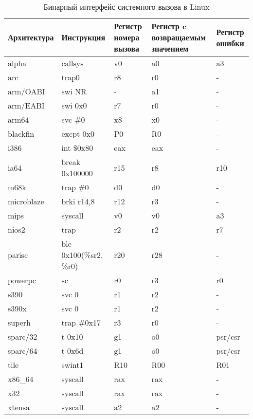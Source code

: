 \begin{table}[t!]
  \caption{Бинарный интерфейс системного вызова в Linux}
  \label{table:syscall_abi}
  \begin{tabular}{| >{\raggedright}m{}
                  | >{}m{}
                  | >{}m{}
                  | >{}m{}
                  | >{\arraybackslash}m{}|}
    \hline
    Архитектура & Инструкция & Регистр номера вызова & Регистр c возвращаемым значением & Регистр ошибки \\ \hline
    alpha & callsys & v0 & a0 & a3 \\ \hline
    arc & trap0 & r8 & r0 & - \\ \hline
    arm/OABI & swi NR & - & a1 & - \\ \hline
    arm/EABI & swi 0x0 & r7 & r0 & - \\ \hline
    arm64 & svc \#0 & x8 & x0 & - \\ \hline
    blackfin & excpt 0x0 & P0 & R0 & - \\ \hline
    i386 & int \$0x80 & eax & eax & - \\ \hline
    ia64 & break 0x100000 & r15 & r8 & r10 \\ \hline
    m68k & trap \#0 & d0 & d0 &  - \\ \hline
    microblaze & brki r14,8 & r12 & r3 & - \\ \hline
    mips & syscall & v0 & v0 & a3 \\ \hline
    nios2 & trap & r2 & r2 & r7 \\ \hline
    parisc & ble 0x100(\%sr2, \%r0) & r20 & r28 & - \\ \hline
    powerpc & sc & r0 & r3 & r0 \\ \hline
    s390 & svc 0 & r1 & r2 & - \\ \hline
    s390x & svc 0 & r1 & r2 & - \\ \hline
    superh & trap \#0x17 & r3 & r0 & - \\ \hline
    sparc/32 & t 0x10 & g1 & o0 & psr/csr \\ \hline
    sparc/64 & t 0x6d & g1 & o0 & psr/csr \\ \hline
    tile & swint1 & R10 & R00 & R01 \\ \hline
    x86\_64 & syscall & rax & rax & - \\ \hline
    x32 & syscall & rax & rax & - \\ \hline
    xtensa & syscall & a2 & a2 & - \\ \hline
  \end{tabular}
\end{table}

